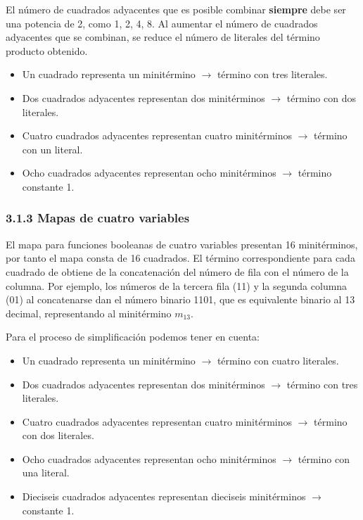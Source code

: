 El n\'{u}mero de cuadrados adyacentes que es posible combinar \textbf{siempre}
debe ser una potencia de 2, como 1, 2, 4, 8. Al aumentar el n\'{u}mero de
cuadrados adyacentes que se combinan, se reduce el n\'{u}mero de literales del
t\'{e}rmino producto obtenido. \begin{itemize} \item Un cuadrado representa un
          minit\'{e}rmino $\rightarrow$ t\'{e}rmino con tres literales. \item Dos
          cuadrados adyacentes representan dos minit\'{e}rminos $\rightarrow$ t\'{e}rmino
          con dos literales. \item Cuatro cuadrados adyacentes representan cuatro
          minit\'{e}rminos $\rightarrow$ t\'{e}rmino con un literal. \item Ocho cuadrados
          adyacentes representan ocho minit\'{e}rminos $\rightarrow$ t\'{e}rmino constante
          1. \end{itemize}

\subsubsection*{3.1.3 Mapas de cuatro variables} El mapa para funciones
booleanas de cuatro variables presentan 16 minit\'{e}rminos, por tanto el mapa
consta de 16 cuadrados. El t\'{e}rmino correspondiente para cada cuadrado de
obtiene de la concatenaci\'{o}n del n\'{u}mero de fila con el n\'{u}mero de la
columna. Por ejemplo, los n\'{u}meros de la tercera fila (11) y la segunda
columna (01) al concatenarse dan el n\'{u}mero binario 1101, que es equivalente
binario al 13 decimal, representando al minit\'{e}rmino $m_{13}$.

Para el proceso de simplificaci\'{o}n podemos tener en cuenta: \begin{itemize}
    \item Un cuadrado representa un minit\'{e}rmino $\rightarrow$ t\'{e}rmino con
          cuatro literales. \item Dos cuadrados adyacentes representan dos
          minit\'{e}rminos $\rightarrow$ t\'{e}rmino con tres literales. \item Cuatro
          cuadrados adyacentes representan cuatro minit\'{e}rminos $\rightarrow$
          t\'{e}rmino con dos literales. \item Ocho cuadrados adyacentes representan ocho
          minit\'{e}rminos $\rightarrow$ t\'{e}rmino con una literal. \item Dieciseis
          cuadrados adyacentes representan dieciseis minit\'{e}rminos $\rightarrow$
          constante 1. \end{itemize}

